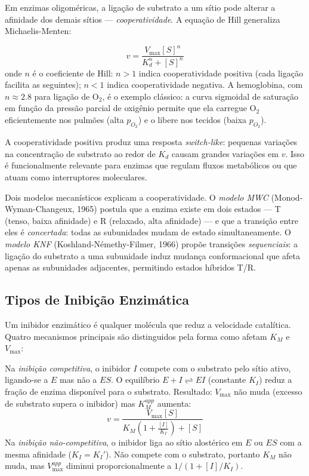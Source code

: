 Em enzimas oligoméricas, a ligação de substrato a um sítio pode alterar a afinidade dos
demais sítios --- \emph{cooperatividade}. A equação de Hill generaliza Michaelis-Menten:

\begin{equation}
v = \frac{V_{\max}[S]^n}{K_d^n + [S]^n}
\end{equation}
onde $n$ é o coeficiente de Hill: $n > 1$ indica cooperatividade positiva (cada ligação
facilita as seguintes); $n < 1$ indica cooperatividade negativa. A hemoglobina, com $n
\approx 2.8$ para ligação de O$_2$, é o exemplo clássico: a curva sigmoidal de saturação
em função da pressão parcial de oxigênio permite que ela carregue O$_2$ eficientemente
nos pulmões (alta $p_{O_2}$) e o libere nos tecidos (baixa $p_{O_2}$).

A cooperatividade positiva produz uma resposta \emph{switch-like}: pequenas variações na
concentração de substrato ao redor de $K_d$ causam grandes variações em $v$. Isso é
funcionalmente relevante para enzimas que regulam fluxos metabólicos ou que atuam como
interruptores moleculares.

Dois modelos mecanísticos explicam a cooperatividade. O \emph{modelo MWC} (Monod-Wyman-Changeux,
1965) postula que a enzima existe em dois estados --- T (tenso, baixa afinidade) e R
(relaxado, alta afinidade) --- e que a transição entre eles é \emph{concertada}: todas as
subunidades mudam de estado simultaneamente. O \emph{modelo KNF} (Koshland-Némethy-Filmer,
1966) propõe transições \emph{sequenciais}: a ligação do substrato a uma subunidade induz
mudança conformacional que afeta apenas as subunidades adjacentes, permitindo estados
híbridos T/R.

\subsection{Tipos de Inibição Enzimática}

Um inibidor enzimático é qualquer molécula que reduz a velocidade catalítica. Quatro
mecanismos principais são distinguidos pela forma como afetam $K_M$ e $V_{\max}$:

Na \emph{inibição competitiva}, o inibidor $I$ compete com o substrato pelo sítio ativo,
ligando-se a $E$ mas não a $ES$. O equilíbrio $E + I \rightleftharpoons EI$ (constante
$K_I$) reduz a fração de enzima disponível para o substrato. Resultado: $V_{\max}$ não
muda (excesso de substrato supera o inibidor) mas $K_M^{app}$ aumenta:
\begin{equation}
v = \frac{V_{\max}[S]}{K_M\!\left(1 + \frac{[I]}{K_I}\right) + [S]}
\end{equation}
Na \emph{inibição não-competitiva}, o inibidor liga ao sítio alostérico em $E$ ou $ES$
com a mesma afinidade ($K_I = K_I'$). Não compete com o substrato, portanto $K_M$ não
muda, mas $V_{\max}^{app}$ diminui proporcionalmente a $1/(1+[I]/K_I)$.


